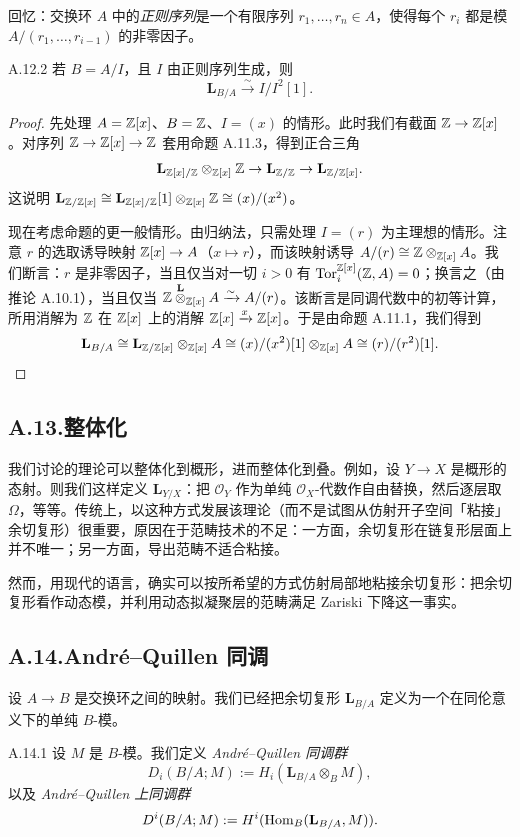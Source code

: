 回忆：交换环 $A$ 中的\emph{正则序列}是一个有限序列 $r_1,\dots,r_n\in A$，使得每个 $r_i$ 都是模 $A/(r_1,\dots,r_{i-1})$ 的非零因子。

\begin{prop}{A.12.2}\label{thm:a6-07-25}
若 $B=A/I$，且 $I$ 由正则序列生成，则
\[
\mathbf L_{B/A}\xrightarrow{\sim}I/I^2[1].
\]
\end{prop}

\begin{proof}
先处理 $A=\mathbb{Z}[x]$、$B=\mathbb{Z}$、$I=(x)$ 的情形。此时我们有截面 $\mathbb{Z}\to\mathbb{Z}[x]$。对序列 $\mathbb{Z}\to\mathbb{Z}[x]\to\mathbb{Z}$ 套用命题 A.11.3，得到正合三角
\[
\mathbf L_{\mathbb{Z}[x]/\mathbb{Z}}\otimes_{\mathbb{Z}[x]}\mathbb{Z}\to\mathbf L_{\mathbb{Z}/\mathbb{Z}}\to\mathbf L_{\mathbb{Z}/\mathbb{Z}[x]}.
\]
这说明 $\mathbf L_{\mathbb{Z}/\mathbb{Z}[x]}\cong\mathbf L_{\mathbb{Z}[x]/\mathbb{Z}}[1]\otimes_{\mathbb{Z}[x]}\mathbb{Z}\cong(x)/(x^2)$。

现在考虑命题的更一般情形。由归纳法，只需处理 $I=(r)$ 为主理想的情形。注意 $r$ 的选取诱导映射 $\mathbb{Z}[x]\to A$（$x\mapsto r$），而该映射诱导 $A/(r)\cong\mathbb{Z}\otimes_{\mathbb{Z}[x]}A$。我们断言：$r$ 是非零因子，当且仅当对一切 $i>0$ 有 $\operatorname{Tor}_i^{\mathbb{Z}[x]}(\mathbb{Z},A)=0$；换言之（由推论 A.10.1），当且仅当 $\mathbb{Z}\overset{\mathbf L}{\otimes}_{\mathbb{Z}[x]}A\xrightarrow{\sim}A/(r)$。该断言是同调代数中的初等计算，所用消解为 $\mathbb{Z}$ 在 $\mathbb{Z}[x]$ 上的消解 $\mathbb{Z}[x]\xrightarrow{x}\mathbb{Z}[x]$。于是由命题 A.11.1，我们得到
\[
\mathbf L_{B/A}\cong\mathbf L_{\mathbb{Z}/\mathbb{Z}[x]}\otimes_{\mathbb{Z}[x]}A\cong(x)/(x^2)[1]\otimes_{\mathbb{Z}[x]}A\cong(r)/(r^2)[1].
\]
\end{proof}

\subsection*{A.13.\quad 整体化}

我们讨论的理论可以整体化到概形，进而整体化到叠。例如，设 $Y\to X$ 是概形的态射。则我们这样定义 $\mathbf L_{Y/X}$：把 $\mathcal O_Y$ 作为单纯 $\mathcal O_X$-代数作自由替换，然后逐层取 $\Omega$，等等。传统上，以这种方式发展该理论（而不是试图从仿射开子空间「粘接」余切复形）很重要，原因在于范畴技术的不足：一方面，余切复形在链复形层面上并不唯一；另一方面，导出范畴不适合粘接。

然而，用现代的语言，确实可以按所希望的方式仿射局部地粘接余切复形：把余切复形看作动态模，并利用动态拟凝聚层的范畴满足 Zariski 下降这一事实。

\subsection*{A.14.\quad André--Quillen 同调}

设 $A\to B$ 是交换环之间的映射。我们已经把余切复形 $\mathbf L_{B/A}$ 定义为一个在同伦意义下的单纯 $B$-模。

\begin{defn}{A.14.1}\label{thm:a6-07-26}
设 $M$ 是 $B$-模。我们定义 \emph{André--Quillen 同调群}
\[
D_i(B/A;M):=H_i(\mathbf L_{B/A}\otimes_B M),
\]
以及 \emph{André--Quillen 上同调群}
\[
D^i(B/A;M):=H^i(\operatorname{Hom}_B(\mathbf L_{B/A},M)).
\]
\end{defn}
